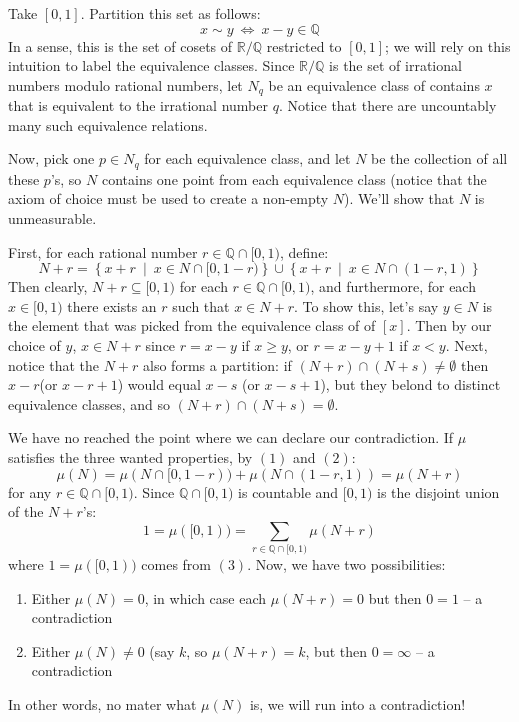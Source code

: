 \documentclass[oneside]{book}
\newcommand{\Q}{\mathbb{Q}}
\newcommand{\R}{\mathbb{R}}
\newcommand{\sse}{\subseteq}
\newcommand{\set}[2]{\left\{#1 \ \middle|\ #2\right\}}
\newcommand{\LRw}{\Leftrightarrow}
\begin{document}
\begin{Proof}
	Take $[0,1]$. Partition this set as follows:
	\[
		x\sim y \ \LRw\ x-y \in \Q
	\]
	In a sense, this is the set of cosets of $\R/\Q$ restricted to $[0,1]$; we will rely on this intuition to label the
	equivalence classes. Since $\R/\Q$ is the set of irrational numbers modulo rational numbers, let $N_q$ be an
	equivalence class of contains $x$ that is equivalent to the irrational number $q$. Notice that there are uncountably
	many such equivalence relations. 

	Now, pick one $p \in N_q$ for each equivalence class, and let $N$ be the collection of all these $p$'s, so $N$
	contains one point from each equivalence class (notice that the axiom of choice must be used to create a non-empty
	$N$). We'll show that $N$ is unmeasurable. 

	First, for each rational number $ r\in \Q\cap [0,1)$, define:
	\[
		N+r = \set{x+r}{x \in N\cap [0, 1-r)}\cup \set{x+r}{x \in N\cap (1-r,1)}
	\]
	Then clearly, $N+r \sse [0,1)$ for each $r \in \Q\cap [0,1)$, and furthermore, for each $x \in [0,1)$ there exists an $r$ such that $x \in N + r$.
	To show this, let's say $y \in N$ is the element that was picked from the equivalence class of of $[x]$. Then by our
	choice of $y$, $x \in N+r$ since $r = x-y$ if $x \ge y$, or $r = x-y+1$ if $x < y$. Next, notice that the $N+r$ also
	forms a partition: if $(N+r)\cap (N+s) \ne \emptyset$ then $x-r $(or $x-r+1$) would equal $x-s$ (or $x-s+1$), but
	they belond to distinct equivalence classes, and so $(N+r)\cap (N+s) = \emptyset$. 

	We have no reached the point where we can declare our contradiction. If $\mu$ satisfies the three wanted properties,
	by $(1)$ and $(2)$:
	\[
		\mu(N) = \mu(N\cap [0,1-r)) + \mu(N\cap (1-r, 1)) = \mu(N+r)
	\]
	for any $r \in \Q \cap [0,1)$. Since $\Q\cap [0,1)$ is countable and $[0,1)$ is the disjoint union of the $N+r$'s:
	\[
		1 = \mu([0,1)) = \sum_{r \in \Q\cap [0,1)}\mu(N+r)
	\]
	where $1 = \mu([0,1))$ comes from $(3)$. Now, we have two possibilities:
	\begin{enumerate}
		\item Either $\mu(N) = 0$, in which case each $\mu(N+r) = 0$ but then $0 = 1$ -- a contradiction
		\item Either $\mu(N) \ne 0$ (say $k$, so $\mu(N+r) = k$, but then $0 = \infty$ -- a contradiction
	\end{enumerate}
	In other words, no mater what $\mu(N)$ is, we will run into a contradiction!
\end{Proof}
\end{document}

